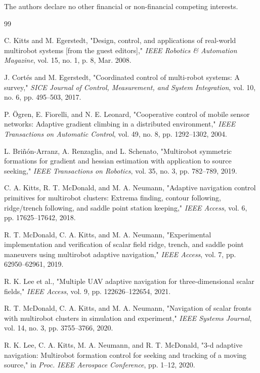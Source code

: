 \documentclass[lettersize,journal]{IEEEtran}
\begin{document}
The authors declare no other financial or non-financial competing interests.


\balance
\begin{thebibliography}{99}

 C. Kitts and M. Egerstedt, "Design, control, and applications of real-world multirobot systems [from the guest editors]," \textit{IEEE Robotics \& Automation Magazine}, vol. 15, no. 1, p. 8, Mar. 2008.

 J. Cortés and M. Egerstedt, "Coordinated control of multi-robot systems: A survey," \textit{SICE Journal of Control, Measurement, and System Integration}, vol. 10, no. 6, pp. 495--503, 2017.

 P. Ögren, E. Fiorelli, and N. E. Leonard, "Cooperative control of mobile sensor networks: Adaptive gradient climbing in a distributed environment," \textit{IEEE Transactions on Automatic Control}, vol. 49, no. 8, pp. 1292--1302, 2004.

 L. Briñón-Arranz, A. Renzaglia, and L. Schenato, "Multirobot symmetric formations for gradient and hessian estimation with application to source seeking," \textit{IEEE Transactions on Robotics}, vol. 35, no. 3, pp. 782--789, 2019.

 C. A. Kitts, R. T. McDonald, and M. A. Neumann, "Adaptive navigation control primitives for multirobot clusters: Extrema finding, contour following, ridge/trench following, and saddle point station keeping," \textit{IEEE Access}, vol. 6, pp. 17625--17642, 2018.

 R. T. McDonald, C. A. Kitts, and M. A. Neumann, "Experimental implementation and verification of scalar field ridge, trench, and saddle point maneuvers using multirobot adaptive navigation," \textit{IEEE Access}, vol. 7, pp. 62950--62961, 2019.

 R. K. Lee et al., "Multiple UAV adaptive navigation for three-dimensional scalar fields," \textit{IEEE Access}, vol. 9, pp. 122626--122654, 2021.

 R. T. McDonald, C. A. Kitts, and M. A. Neumann, "Navigation of scalar fronts with multirobot clusters in simulation and experiment," \textit{IEEE Systems Journal}, vol. 14, no. 3, pp. 3755--3766, 2020.

 R. K. Lee, C. A. Kitts, M. A. Neumann, and R. T. McDonald, "3-d adaptive navigation: Multirobot formation control for seeking and tracking of a moving source," in \textit{Proc. IEEE Aerospace Conference}, pp. 1--12, 2020.


\end{thebibliography}
\end{document}
